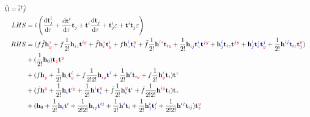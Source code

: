 \documentclass{article}
\newcommand{\bh}{\textbf{h}}
\newcommand{\bt}{\textbf{t}}
\newcommand{\up}[1]{\hat{#1}^{\dagger}}
\newcommand{\down}[1]{\hat{#1}}
\begin{document}
\begin{align}\begin{split}
    \hat{\Omega} = \up{i}\down{j}
\\ LHS &=
    i\left(\dv{\bt^{i}_{j}}{\tau} + \dv{\bt^{i}_{}}{\tau}\bt^{}_{j} + \bt^{i}_{}\dv{\bt^{}_{j}}{\tau} + \bt^{i}_{j}\varepsilon + \bt^{i}_{}\bt^{}_{j}\varepsilon\right)
\\ RHS &=
%
%
(f\bar{f}\bh^{\blue{}\red{z}}_{\blue{}\red{y}} + f\frac{1}{2!}\bh^{\blue{}\red{}}_{\blue{i}\red{z}}\bt^{\blue{i}\red{y}} + \bar{f}\bh^{\blue{}\red{z}}_{\blue{i}\red{}}\bt^{\blue{i}\red{}}_{\blue{}\red{y}} + f\bh^{\blue{i}\red{}}_{\blue{}\red{z}}\bt^{\blue{}\red{y}}_{\blue{i}\red{}} + \bar{f}\frac{1}{2!}\bh^{\blue{i}\red{z}}_{\blue{}\red{}}\bt_{\blue{i}\red{y}} + \frac{1}{2!}\bh^{\blue{}\red{}}_{\blue{ij}\red{}}\bt^{\blue{i}\red{}}_{\blue{}\red{z}}\bt^{\blue{j}\red{y}} + \bh^{\blue{i}\red{}}_{\blue{j}\red{}}\bt_{\blue{i}\red{z}}\bt^{\blue{j}\red{y}} + \bh^{\blue{i}\red{}}_{\blue{j}\red{}}\bt^{\blue{}\red{z}}_{\blue{i}\red{}}\bt^{\blue{j}\red{}}_{\blue{}\red{y}} + \frac{1}{2!}\bh^{\blue{ij}\red{}}_{\blue{}\red{}}\bt_{\blue{i}\red{z}}\bt^{\blue{}\red{y}}_{\blue{j}\red{}})
%
%
\\  &+
%
%
(\frac{1}{2!}\bh_0)\bt_{\blue{}\red{z}}\bt^{\blue{}\red{y}}
    \\  &+  %
(f\bh^{\blue{}\red{}}_{\blue{}\red{y}} + \frac{1}{2!}\bh^{\blue{}\red{}}_{\blue{i}\red{}}\bt^{\blue{i}\red{}}_{\blue{}\red{y}} + f\frac{1}{2!2!}\bh^{\blue{}\red{}}_{\blue{i}\red{y}}\bt^{\blue{i}\red{}} + \frac{1}{2!}\bh^{\blue{i}\red{}}_{\blue{}\red{}}\bt_{\blue{i}\red{y}} + f\frac{1}{2!}\bh^{\blue{i}\red{}}_{\blue{}\red{y}}\bt_{\blue{i}\red{}})\bt^{\blue{}\red{z}}
    \\  &+  %
(\bar{f}\bh^{\blue{}\red{y}}_{\blue{}\red{}} + \frac{1}{2!}\bh^{\blue{}\red{}}_{\blue{i}\red{}}\bt^{\blue{i}\red{y}} + \frac{1}{2!}\bh^{\blue{i}\red{}}_{\blue{}\red{}}\bt^{\blue{}\red{y}}_{\blue{i}\red{}} + \bar{f}\frac{1}{2!}\bh^{\blue{}\red{y}}_{\blue{i}\red{}}\bt^{\blue{i}\red{}} + \bar{f}\frac{1}{2!2!}\bh^{\blue{i}\red{y}}_{\blue{}\red{}}\bt_{\blue{i}\red{}})\bt_{\blue{}\red{z}}
%
%
\\  &+
%
%
(\bh_0 + \frac{1}{2!}\bh^{\blue{}\red{}}_{\blue{i}\red{}}\bt^{\blue{i}\red{}} + \frac{1}{2!2!}\bh^{\blue{}\red{}}_{\blue{ij}\red{}}\bt^{\blue{ij}\red{}} + \frac{1}{2!}\bh^{\blue{i}\red{}}_{\blue{}\red{}}\bt_{\blue{i}\red{}} + \frac{1}{2!}\bh^{\blue{i}\red{}}_{\blue{j}\red{}}\bt^{\blue{j}\red{}}_{\blue{i}\red{}} + \frac{1}{2!2!}\bh^{\blue{ij}\red{}}_{\blue{}\red{}}\bt_{\blue{ij}\red{}})\bt^{\blue{}\red{y}}_{\blue{}\red{z}}
\end{split}\end{align}
\end{document}
